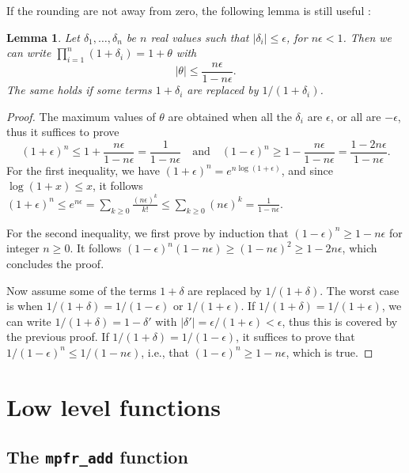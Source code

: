 \documentclass[12pt]{amsart}
\newtheorem{lemma}{Lemma}
\begin{document}
If the rounding are not away from zero, the following lemma is still useful
\cite[Lemma 3.1]{Higham02}:
\begin{lemma} \label{lemma_graillat}
Let $\delta_1, \ldots, \delta_n$ be $n$ real values such that
$|\delta_i| \leq \epsilon$, for $n \epsilon < 1$.
Then we can write $\prod_{i=1}^n (1+\delta_i)
= 1 + \theta$ with
\[ |\theta| \leq \frac{n \epsilon}{1 - n \epsilon}. \]
The same holds if some terms $1+\delta_i$ are replaced by $1/(1+\delta_i)$.
\end{lemma}
\begin{proof}
The maximum values of $\theta$ are obtained when all the $\delta_i$ are
$\epsilon$, or all are $-\epsilon$, thus it suffices to prove
\[ (1+\epsilon)^n \leq 1 + \frac{n \epsilon}{1 - n \epsilon}
   = \frac{1}{1 - n \epsilon}
   \quad \mbox{and} \quad
   (1-\epsilon)^n \geq 1 - \frac{n \epsilon}{1 - n \epsilon}
   = \frac{1 - 2 n \epsilon}{1 - n \epsilon}. \]
For the first inequality, we have $(1+\epsilon)^n = e^{n \log(1+\epsilon)}$,
and since $\log(1+x) \leq x$, it follows $(1+\epsilon)^n \leq e^{n \epsilon}
= \sum_{k \geq 0} \frac{(n \epsilon)^k}{k!} \leq \sum_{k \geq 0}
 (n \epsilon)^k = \frac{1}{1 - n \epsilon}$.

For the second inequality, we first prove by induction that $(1-\epsilon)^n
\geq 1 - n \epsilon$ for integer $n \geq 0$.
It follows $(1-\epsilon)^n (1 - n \epsilon) \geq (1 - n \epsilon)^2 \geq
1 - 2 n \epsilon$, which concludes the proof.

Now assume some of the terms $1+\delta$ are replaced by $1/(1+\delta)$.
The worst case is when $1/(1+\delta) = 1/(1-\epsilon)$ or
$1/(1+\epsilon)$.
If $1/(1+\delta) = 1/(1+\epsilon)$, we can write
$1/(1+\delta) = 1 - \delta'$ with $|\delta'| = \epsilon/(1+\epsilon)
< \epsilon$, thus this is covered by the previous proof.
If $1/(1+\delta) = 1/(1-\epsilon)$, it suffices to prove that
$1/(1-\epsilon)^n \leq 1/(1-n\epsilon)$, i.e., that
$(1-\epsilon)^n \geq 1-n\epsilon$, which is true.
\end{proof}

\section{Low level functions}

\subsection{The {\tt mpfr\_add} function}
\end{document}
